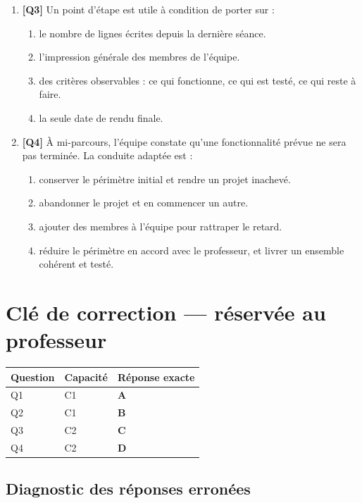 \begin{enumerate}
\item \textbf{[Q3]} Un point d'étape est utile à condition de porter sur :
  \begin{enumerate}[label=\Alph*.]
    \item le nombre de lignes écrites depuis la dernière séance.
    \item l'impression générale des membres de l'équipe.
    \item des critères observables : ce qui fonctionne, ce qui est testé, ce qui reste à faire.
    \item la seule date de rendu finale.
  \end{enumerate}

\item \textbf{[Q4]} À mi-parcours, l'équipe constate qu'une fonctionnalité prévue ne sera pas terminée. La conduite adaptée est :
  \begin{enumerate}[label=\Alph*.]
    \item conserver le périmètre initial et rendre un projet inachevé.
    \item abandonner le projet et en commencer un autre.
    \item ajouter des membres à l'équipe pour rattraper le retard.
    \item réduire le périmètre en accord avec le professeur, et livrer un ensemble cohérent et testé.
  \end{enumerate}

\end{enumerate}

\ifnxVersionProfesseur
\clearpage
\section*{Clé de correction — réservée au professeur}

\begin{center}
\begin{tabular}{lll}
\hline
Question & Capacité & Réponse exacte \\
\hline
Q1 & C1 & \textbf{A} \\
Q2 & C1 & \textbf{B} \\
Q3 & C2 & \textbf{C} \\
Q4 & C2 & \textbf{D} \\
\hline
\end{tabular}
\end{center}

\subsection*{Diagnostic des réponses erronées}

